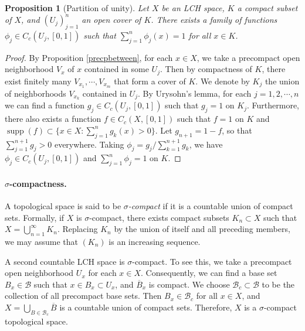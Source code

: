 \documentclass{article}
\numberwithin{equation}{section}
\DeclareMathOperator{\supp}{supp}
\theoremstyle{plain}
\newtheorem{proposition}[theorem]{Proposition}
\theoremstyle{definition}
\begin{document}
\begin{proposition}[Partition of unity]\label{partunity}
	Let $X$ be an LCH space, $K$ a compact subset of $X$, and $(U_j)_{j=1}^n$ an open cover of $K$. There exists a family of functions $\phi_j\in C_c(U_j,[0,1])$ such that $\sum_{j=1}^n \phi_j(x)=1$ for all $x\in K$. 
\end{proposition}
\begin{proof}
	By Proposition \ref{precpbetween}, for each $x\in X$, we take a precompact open neighborhood $V_x$ of $x$ contained in some $U_j$. Then by compactness of $K$, there exist finitely many $V_{x_1},\cdots,V_{x_m}$ that form a cover of $K$. We denote by $K_j$ the union of neighborhoods $V_{x_k}$ contained in $U_j$. By Urysohn's lemma, for each $j=1,2,\cdots,n$ we can find a function $g_j\in C_c(U_j,[0,1])$ such that $g_j=1$ on $K_j$. Furthermore, there also exists a function $f\in C_c(X,[0,1])$ such that $f=1$ on $K$ and $\supp(f)\subset\{x\in X:\sum_{j=1}^n g_k(x)>0\}$. Let $g_{n+1}=1-f$, so that $\sum_{j=1}^{n+1}g_j>0$ everywhere. Taking $\phi_j=g_j/\sum_{k=1}^{n+1}g_k$, we have $\phi_j\in C_c(U_j,[0,1])$ and $\sum_{j=1}^n\phi_j=1$ on $K$.
\end{proof}

\paragraph{$\sigma$-compactness.} A topological space is said to be \textit{$\sigma$-compact} if it is a countable union of compact sets. Formally, if $X$ is $\sigma$-compact, there exists compact subsets $K_n\subset X$ such that $X=\bigcup_{n=1}^\infty K_n$. Replacing $K_n$ by the union of itself and all preceding members, we may assume that $(K_n)$ is an increasing sequence.

A second countable LCH space is $\sigma$-compact. To see this, we take a precompact open neighborhood $U_x$ for each $x\in X$. Consequently, we can find a base set $B_x\in\mathscr{B}$ such that $x\in B_x\subset U_x$, and $\overline{B}_x$ is compact. We choose $\mathscr{B}_c\subset\mathscr{B}$ to be the collection of all precompact base sets. Then $B_x\in\mathscr{B}_c$ for all $x\in X$, and $X=\bigcup_{B\in\mathscr{B}_c}\overline{B}$ is a countable union of compact sets. Therefore, $X$ is a $\sigma$-compact topological space.
\end{document}
